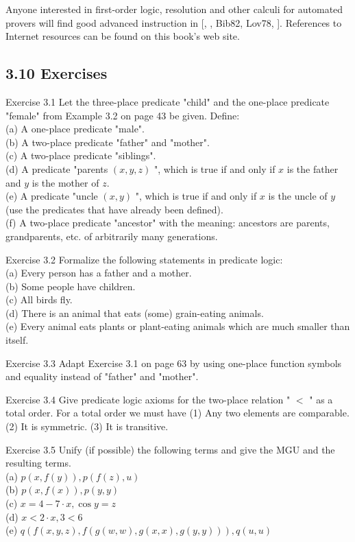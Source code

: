 \documentclass[10pt]{article}
\begin{document}
Anyone interested in first-order logic, resolution and other calculi for automated provers will find good advanced instruction in [\cite{newborn2000automated}, \cite{fitting1996first}, Bib82, Lov78, \cite{chang1973symbolic}]. References to Internet resources can be found on this book's web site.

\subsection*{3.10 Exercises}
Exercise 3.1 Let the three-place predicate "child" and the one-place predicate "female" from Example 3.2 on page 43 be given. Define:\\
(a) A one-place predicate "male".\\
(b) A two-place predicate "father" and "mother".\\
(c) A two-place predicate "siblings".\\
(d) A predicate "parents $(x, y, z)$ ", which is true if and only if $x$ is the father and $y$ is the mother of $z$.\\
(e) A predicate "uncle $(x, y)$ ", which is true if and only if $x$ is the uncle of $y$ (use the predicates that have already been defined).\\
(f) A two-place predicate "ancestor" with the meaning: ancestors are parents, grandparents, etc. of arbitrarily many generations.


Exercise 3.2 Formalize the following statements in predicate logic:\\
(a) Every person has a father and a mother.\\
(b) Some people have children.\\
(c) All birds fly.\\
(d) There is an animal that eats (some) grain-eating animals.\\
(e) Every animal eats plants or plant-eating animals which are much smaller than itself.

Exercise 3.3 Adapt Exercise 3.1 on page 63 by using one-place function symbols and equality instead of "father" and "mother".

Exercise 3.4 Give predicate logic axioms for the two-place relation " $<$ " as a total order. For a total order we must have (1) Any two elements are comparable. (2) It is symmetric. (3) It is transitive.

Exercise 3.5 Unify (if possible) the following terms and give the MGU and the resulting terms.\\
(a) $p(x, f(y)), p(f(z), u)$\\
(b) $p(x, f(x)), p(y, y)$\\
(c) $x=4-7 \cdot x, \cos y=z$\\
(d) $x<2 \cdot x, 3<6$\\
(e) $q(f(x, y, z), f(g(w, w), g(x, x), g(y, y))), q(u, u)$
\end{document}
